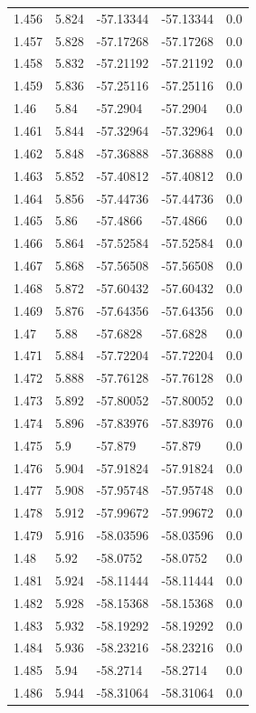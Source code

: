 \begin{tabular}{lllll}
1.456 & 5.824 & -57.13344 & -57.13344 & 0.0 \\
1.457 & 5.828 & -57.17268 & -57.17268 & 0.0 \\
1.458 & 5.832 & -57.21192 & -57.21192 & 0.0 \\
1.459 & 5.836 & -57.25116 & -57.25116 & 0.0 \\
1.46 & 5.84 & -57.2904 & -57.2904 & 0.0 \\
1.461 & 5.844 & -57.32964 & -57.32964 & 0.0 \\
1.462 & 5.848 & -57.36888 & -57.36888 & 0.0 \\
1.463 & 5.852 & -57.40812 & -57.40812 & 0.0 \\
1.464 & 5.856 & -57.44736 & -57.44736 & 0.0 \\
1.465 & 5.86 & -57.4866 & -57.4866 & 0.0 \\
1.466 & 5.864 & -57.52584 & -57.52584 & 0.0 \\
1.467 & 5.868 & -57.56508 & -57.56508 & 0.0 \\
1.468 & 5.872 & -57.60432 & -57.60432 & 0.0 \\
1.469 & 5.876 & -57.64356 & -57.64356 & 0.0 \\
1.47 & 5.88 & -57.6828 & -57.6828 & 0.0 \\
1.471 & 5.884 & -57.72204 & -57.72204 & 0.0 \\
1.472 & 5.888 & -57.76128 & -57.76128 & 0.0 \\
1.473 & 5.892 & -57.80052 & -57.80052 & 0.0 \\
1.474 & 5.896 & -57.83976 & -57.83976 & 0.0 \\
1.475 & 5.9 & -57.879 & -57.879 & 0.0 \\
1.476 & 5.904 & -57.91824 & -57.91824 & 0.0 \\
1.477 & 5.908 & -57.95748 & -57.95748 & 0.0 \\
1.478 & 5.912 & -57.99672 & -57.99672 & 0.0 \\
1.479 & 5.916 & -58.03596 & -58.03596 & 0.0 \\
1.48 & 5.92 & -58.0752 & -58.0752 & 0.0 \\
1.481 & 5.924 & -58.11444 & -58.11444 & 0.0 \\
1.482 & 5.928 & -58.15368 & -58.15368 & 0.0 \\
1.483 & 5.932 & -58.19292 & -58.19292 & 0.0 \\
1.484 & 5.936 & -58.23216 & -58.23216 & 0.0 \\
1.485 & 5.94 & -58.2714 & -58.2714 & 0.0 \\
1.486 & 5.944 & -58.31064 & -58.31064 & 0.0 \\

\end{tabular}
